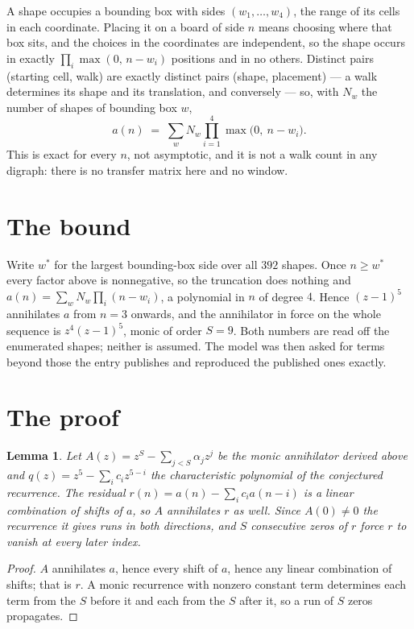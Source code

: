 \documentclass[11pt,a4paper]{article}
\theoremstyle{plain}
\newtheorem{lemma}[theorem]{Lemma}
\theoremstyle{definition}
\begin{document}
A shape occupies a bounding box with sides $(w_1,\dots,w_{4})$, the range of its cells in each
coordinate. Placing it on a board of side $n$ means choosing where that box sits, and the
choices in the coordinates are independent, so the shape occurs in exactly
$\prod_{i}\max(0,\,n-w_i)$ positions and in no others. Distinct pairs (starting cell,
walk) are exactly distinct pairs (shape, placement) --- a walk determines its shape and its
translation, and conversely --- so, with $N_w$ the number of shapes of bounding box $w$,
\[
a(n)\;=\;\sum_{w} N_w \prod_{i=1}^{4}\max\bigl(0,\ n-w_i\bigr).
\]
This is exact for every $n$, not asymptotic, and it is not a walk count in any digraph: there is
no transfer matrix here and no window.

\section{The bound}

Write $w^\ast$ for the largest bounding-box side over all $392$ shapes. Once $n\ge w^\ast$
every factor above is nonnegative, so the truncation does nothing and
$a(n)=\sum_w N_w\prod_i(n-w_i)$, a polynomial in $n$ of degree $4$. Hence $(z-1)^{5}$
annihilates $a$ from $n=3$ onwards, and the annihilator in force on the whole sequence is
$z^{4}(z-1)^{5}$, monic of order $S=9$. Both numbers are read off the enumerated
shapes; neither is assumed. The model was then asked for terms beyond those the entry publishes
and reproduced the published ones exactly.

\section{The proof}

\begin{lemma}\label{lem:crit}
Let $A(z)=z^S-\sum_{j<S}\alpha_jz^{j}$ be the monic annihilator derived above and
$q(z)=z^{5}-\sum_ic_iz^{5-i}$ the characteristic polynomial of the conjectured
recurrence. The residual $r(n)=a(n)-\sum_ic_ia(n-i)$ is a linear combination of shifts of $a$,
so $A$ annihilates $r$ as well. Since $A(0)\ne0$ the recurrence it gives runs in both
directions, and $S$ consecutive zeros of $r$ force $r$ to vanish at every later index.
\end{lemma}

\begin{proof}
$A$ annihilates $a$, hence every shift of $a$, hence any linear combination of shifts; that is
$r$. A monic recurrence with nonzero constant term determines each term from the $S$ before it
and each from the $S$ after it, so a run of $S$ zeros propagates.
\end{proof}
\end{document}

